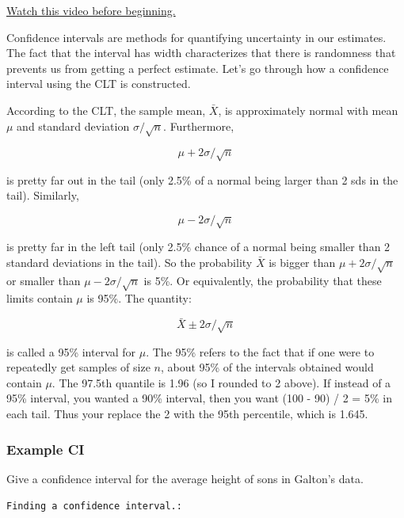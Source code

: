 \documentclass[]{article}
\newenvironment{Shaded}{\begin{snugshade}}{\end{snugshade}}
\newcommand{\KeywordTok}[1]{\textcolor[rgb]{0.13,0.29,0.53}{\textbf{{#1}}}}
\newcommand{\DecValTok}[1]{\textcolor[rgb]{0.00,0.00,0.81}{{#1}}}
\newcommand{\FloatTok}[1]{\textcolor[rgb]{0.00,0.00,0.81}{{#1}}}
\newcommand{\StringTok}[1]{\textcolor[rgb]{0.31,0.60,0.02}{{#1}}}
\newcommand{\NormalTok}[1]{{#1}}
\begin{document}
\href{http://youtu.be/u85aQ0mtiZ8?list=PLpl-gQkQivXiBmGyzLrUjzsblmQsLtkzJ}{Watch
this video before beginning.}

Confidence intervals are methods for quantifying uncertainty in our
estimates. The fact that the interval has width characterizes that there
is randomness that prevents us from getting a perfect estimate. Let's go
through how a confidence interval using the CLT is constructed.

According to the CLT, the sample mean, $\bar X$, is approximately normal
with mean $\mu$ and standard deviation $\sigma / \sqrt{n}$. Furthermore,

\[\mu + 2 \sigma /\sqrt{n}\]

is pretty far out in the tail (only 2.5\% of a normal being larger than
2 sds in the tail). Similarly,

\[\mu - 2 \sigma /\sqrt{n}\]

is pretty far in the left tail (only 2.5\% chance of a normal being
smaller than 2 standard deviations in the tail). So the probability
$\bar X$ is bigger than $\mu + 2 \sigma / \sqrt{n}$ or smaller than
$\mu - 2 \sigma / \sqrt{n}$ is 5\%. Or equivalently, the probability
that these limits contain $\mu$ is 95\%. The quantity:

\[\bar X \pm 2 \sigma /\sqrt{n}\]

is called a 95\% interval for $\mu$. The 95\% refers to the fact that if
one were to repeatedly get samples of size $n$, about 95\% of the
intervals obtained would contain $\mu$. The 97.5th quantile is 1.96 (so
I rounded to 2 above). If instead of a 95\% interval, you wanted a 90\%
interval, then you want (100 - 90) / 2 = 5\% in each tail. Thus your
replace the 2 with the 95th percentile, which is 1.645.

\subsubsection{Example CI}\label{example-ci}

Give a confidence interval for the average height of sons in Galton's
data.

\vspace{1pc}

\verb;Finding a confidence interval.:;

\begin{Shaded}
\end{Shaded}
\end{document}
